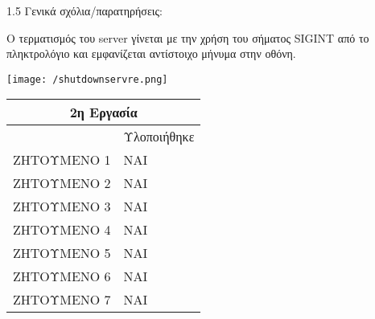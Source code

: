 \documentclass{article}
\begin{document}
\huge{1.5 Γενικά σχόλια/παρατηρήσεις:}
\par
\vspace{0.5cm}
\large{
\par
Ο τερματισμός του server γίνεται με την χρήση του σήματος SIGINT από το πληκτρολόγιο και εμφανίζεται αντίστοιχο μήνυμα στην οθόνη.
\par
}
\vspace{0.5cm}
\begin{center}
\texttt{[image: /shutdownservre.png]}
\end{center}


\par
\vspace{0.2cm}


\par
\vspace{1cm}
\centering
\begin{tabular}{ |p{13cm}||p{3cm}|  }
 \hline
 \multicolumn{2}{|c|}{2η Εργασία} \\
 \hline
 & Υλοποιήθηκε\\
 \hline

ΖΗΤΟΥΜΕΝΟ 1
   & ΝΑΙ    \\
 ΖΗΤΟΥΜΕΝΟ 2&   ΝΑΙ  \\
 ΖΗΤΟΥΜΕΝΟ 3 &ΝΑΙ \\
 ΖΗΤΟΥΜΕΝΟ 4
    &ΝΑΙ \\
 ΖΗΤΟΥΜΕΝΟ 5&   ΝΑΙ  \\
 ΖΗΤΟΥΜΕΝΟ 6& NAI    \\
 ΖΗΤΟΥΜΕΝΟ 7& ΝΑΙ  \\
 \hline
\end{tabular}
\end{document}
